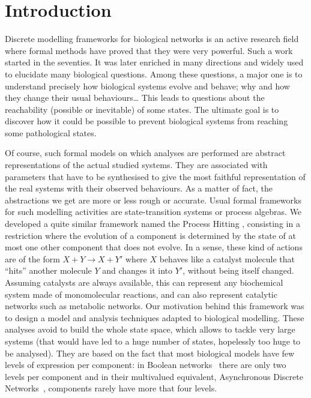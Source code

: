 \section{Introduction}
\label{sec:intro}

Discrete modelling frameworks for biological networks is an active research field where formal methods have proved that they were very powerful.
Such a work started in the seventies.
It was later enriched in many directions and widely used to elucidate many biological questions.
Among these questions, a major one is to understand precisely how biological systems evolve and behave; why and how they change their usual behaviours…
This leads to questions about the reachability (possible or inevitable) of some states.
The ultimate goal is to discover how it could be possible to prevent biological systems from reaching some pathological states.

Of course, such formal models on which analyses are performed are abstract representations of the actual studied systems.
They are associated with parameters that have to be synthesised %
to give the most faithful representation of the real systems with their observed behaviours.
As a matter of fact, the abstractions we get are more or less rough or accurate.
Usual formal frameworks for such modelling activities are state-transition systems or process algebras. %
We developed a quite similar framework named the Process Hitting \cite{PMR10-TCSB},
consisting in a restriction where the evolution of a component is determined by the state of at most one other component that does not evolve.
In a sense, these kind of actions are of the form $X + Y \rightarrow X + Y'$ where $X$ behaves like a catalyst molecule that “hits” another molecule $Y$ and changes it into $Y'$, without being itself changed.
Assuming catalysts are always available, this can represent any biochemical system made of monomolecular reactions, and can also represent catalytic networks such as metabolic networks.
Our motivation behind this framework was to design a model and analysis techniques adapted to biological modelling.
These analyses avoid to build the whole state space, which allows to tackle very large systems (that would have led to a huge number of states, hopelessly too huge to be analysed).
They are based on the fact that most biological models have few levels of expression per component:
in Boolean networks~\cite{kauffman69,Thomas73} there are only two levels per component and in their multivalued equivalent, Asynchronous Discrete Networks~\cite{deJong02}, components rarely have more that four levels.

